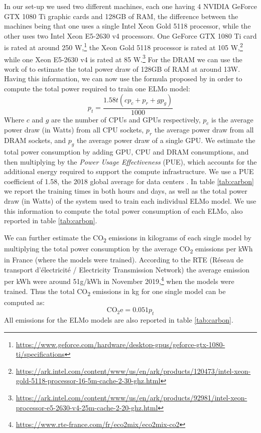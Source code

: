 In our set-up we used two different machines, each one having 4 NVIDIA GeForce GTX 1080 Ti graphic cards and 128GB of RAM, the difference between the machines being that one uses a single Intel Xeon Gold 5118 processor, while the other uses two Intel Xeon E5-2630 v4 processors. One GeForce GTX 1080 Ti card is rated at around 250 W,\footnote{\url{https://www.geforce.com/hardware/desktop-gpus/geforce-gtx-1080-ti/specifications}} the Xeon Gold 5118 processor is rated at 105 W,\footnote{\url{https://ark.intel.com/content/www/us/en/ark/products/120473/intel-xeon-gold-5118-processor-16-5m-cache-2-30-ghz.html}} while one Xeon E5-2630 v4 is rated at 85 W.\footnote{\url{https://ark.intel.com/content/www/us/en/ark/products/92981/intel-xeon-processor-e5-2630-v4-25m-cache-2-20-ghz.html}} For the DRAM we can use the work of \citet{desrochers-etal-2016-a} to estimate the total power draw of 128GB of RAM at around 13W. Having this information, we can now use the formula proposed by \citet{strubell-etal-2019-energy} in order to compute the total power required to train one ELMo model:
\[
    p_t = \frac{1.58t(cp_{c} + p_r + gp_g)}{1000}
\]
Where $c$ and $g$ are the number of CPUs and GPUs respectively, $p_c$ is the average power draw (in Watts) from all CPU sockets, $p_r$ the average power draw from all DRAM sockets, and $p_g$ the average power draw of a single GPU. We estimate the total power consumption by adding GPU, CPU and DRAM consumptions, and then multiplying by the \emph{Power Usage Effectiveness} (PUE), which accounts for the additional energy required to support the compute infrastructure. We use a PUE coefficient of 1.58, the 2018 global average for data centers \citep{strubell-etal-2019-energy}. In table \ref{tab:carbon} we report the training times in both hours and days, as well as the total power draw (in Watts) of the system used to train each individual ELMo model. We use this information to compute the total power consumption of each ELMo, also reported in table \ref{tab:carbon}.

We can further estimate the CO\textsubscript{2} emissions in kilograms of each single model by multiplying the total power consumption by the average CO\textsubscript{2} emissions per kWh in France (where the models were trained). According to the RTE (Réseau de transport d'électricité / Electricity Transmission Network) the average emission per kWh were around 51g/kWh in November 2019,\footnote{\url{https://www.rte-france.com/fr/eco2mix/eco2mix-co2}} when the models were trained. Thus the total CO\textsubscript{2} emissions in kg for one single model can be computed as:
\[
    \text{CO}_{2}\text{e} = 0.051 p_t
\]
All emissions for the ELMo models are also reported in table \ref{tab:carbon}.

